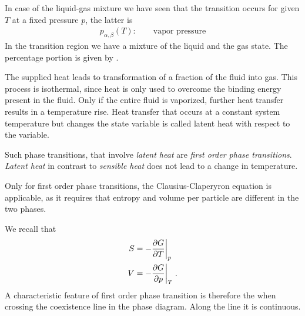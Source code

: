 In case of the liquid-gas mixture we have seen that the transition occurs for given $T$ at a fixed pressure $p$, the latter is
%
\begin{align*}
p_{\alpha,\beta}(T):\qquad\text{vapor pressure} 
\end{align*}
%
In the transition region we have a mixture of the liquid and the gas state. The percentage portion is given by .

The supplied heat leads to transformation of a fraction of the  fluid into gas. This process is isothermal, since heat is only used to overcome the binding energy present in the fluid.
Only if the entire  fluid is vaporized, further heat transfer results in a temperature rise.
Heat transfer that occurs at a constant system temperature but changes the state variable is 
called latent heat with respect to the variable.

Such phase transitions, that involve {\em latent heat} are {\em first order phase transitions}.
{\em Latent heat} in contrast to {\em sensible heat} does not lead to a change in temperature.

Only for first order phase transitions, the Clausius-Claperyron equation is applicable, as it 
requires that entropy and volume per particle are different in the two phases.

We recall that 
%
\begin{align}\label{eq:}
S &= -\frac{\partial G}{\partial T}\bigg|_{p}\\
V &= -\frac{\partial G}{\partial p}\bigg|_{T}\;.
\end{align}
%
A characteristic feature of first order phase transition is therefore the  when crossing the coexistence line in the phase diagram.
Along the line it is continuous.

